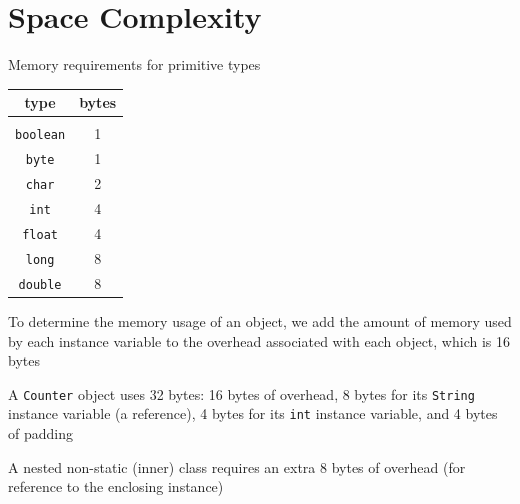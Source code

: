 \documentclass[8pt,a4paper,compress]{beamer}
\begin{document}
\section{Space Complexity}
\begin{frame}[fragile]
\pause

Memory requirements for primitive types
\begin{center}
\begin{tabular}{cc}
type & bytes \\ \hline \\
\lstinline$boolean$ & 1 \\
\lstinline$byte$ & 1 \\
\lstinline$char$ & 2 \\
\lstinline$int$ & 4 \\
\lstinline$float$ & 4 \\
\lstinline$long$ & 8 \\
\lstinline$double$ & 8
\end{tabular} 
\end{center}

\pause
\bigskip

To determine the memory usage of an object, we add the amount of memory used by each instance variable to the overhead associated with each object, which is 16 bytes

\pause
\bigskip

A \lstinline{Counter} object uses 32 bytes: 16 bytes of overhead, 8 bytes for its \lstinline{String} instance variable (a reference), 4 bytes for its \lstinline{int} instance variable, and 4 bytes of padding

\pause
\bigskip

A nested non-static (inner) class requires an extra 8 bytes of overhead (for reference to the enclosing instance)
\end{frame}
\end{document}
